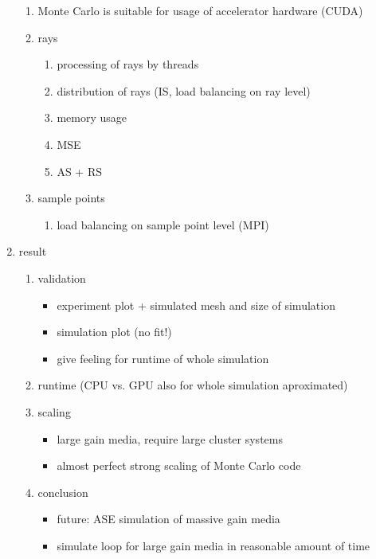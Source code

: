 \documentclass[12pt]{article}
\begin{document}
\begin{enumerate}
  \begin{enumerate}
  \item Monte Carlo is suitable for usage of accelerator hardware (CUDA)
  \item rays
    \begin{enumerate}
    \item processing of rays by threads
    \item distribution of rays (IS, load balancing on ray level)
    \item memory usage
    \item MSE
    \item AS + RS
    \end{enumerate}
  \item sample points
    \begin{enumerate}
    \item load balancing on sample point level (MPI)
    \end{enumerate}
  \end{enumerate}
  \item result
    \begin{enumerate}
      \item validation
        \begin{itemize}
          \item experiment plot + simulated mesh and size of simulation
          \item simulation plot (no fit!)
          \item give feeling for runtime of whole simulation
        \end{itemize}
      \item runtime (CPU vs. GPU also for whole simulation aproximated)
      \item scaling
        \begin{itemize}
          \item large gain media, require large cluster systems
          \item almost perfect strong scaling of Monte Carlo code
        \end{itemize}
      \item conclusion
        \begin{itemize}
          \item future: ASE simulation of massive gain media
          \item simulate loop for large gain media in reasonable amount of time
        \end{itemize}
    \end{enumerate}
\end{enumerate}
\end{document}

